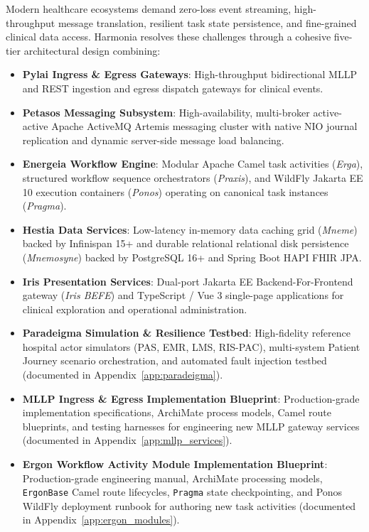 Modern healthcare ecosystems demand zero-loss event streaming, high-throughput message translation, resilient task state persistence, and fine-grained clinical data access. Harmonia resolves these challenges through a cohesive five-tier architectural design combining:
\begin{itemize}
    \item \textbf{Pylai Ingress \& Egress Gateways}: High-throughput bidirectional MLLP and REST ingestion and egress dispatch gateways for clinical events.
    \item \textbf{Petasos Messaging Subsystem}: High-availability, multi-broker active-active Apache ActiveMQ Artemis messaging cluster with native NIO journal replication and dynamic server-side message load balancing.
    \item \textbf{Energeia Workflow Engine}: Modular Apache Camel task activities (\textit{Erga}), structured workflow sequence orchestrators (\textit{Praxis}), and WildFly Jakarta EE 10 execution containers (\textit{Ponos}) operating on canonical task instances (\textit{Pragma}).
    \item \textbf{Hestia Data Services}: Low-latency in-memory data caching grid (\textit{Mneme}) backed by Infinispan 15+ and durable relational relational disk persistence (\textit{Mnemosyne}) backed by PostgreSQL 16+ and Spring Boot HAPI FHIR JPA.
    \item \textbf{Iris Presentation Services}: Dual-port Jakarta EE Backend-For-Frontend gateway (\textit{Iris BEFE}) and TypeScript / Vue 3 single-page applications for clinical exploration and operational administration.
    \item \textbf{Paradeigma Simulation \& Resilience Testbed}: High-fidelity reference hospital actor simulators (PAS, EMR, LMS, RIS-PAC), multi-system Patient Journey scenario orchestration, and automated fault injection testbed (documented in Appendix~\ref{app:paradeigma}).
    \item \textbf{MLLP Ingress \& Egress Implementation Blueprint}: Production-grade implementation specifications, ArchiMate process models, Camel route blueprints, and testing harnesses for engineering new MLLP gateway services (documented in Appendix~\ref{app:mllp_services}).
    \item \textbf{Ergon Workflow Activity Module Implementation Blueprint}: Production-grade engineering manual, ArchiMate processing models, \texttt{ErgonBase} Camel route lifecycles, \texttt{Pragma} state checkpointing, and Ponos WildFly deployment runbook for authoring new task activities (documented in Appendix~\ref{app:ergon_modules}).

\end{itemize}
